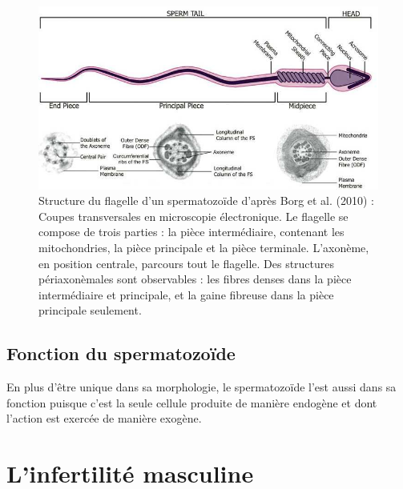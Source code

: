 \documentclass[12pt,twoside]{reedthesis}
\theoremstyle{definition}
\theoremstyle{definition}
\theoremstyle{remark}
\begin{document}
  \begin{figure}
  
  {\centering \includegraphics[scale=.55]{figure/sperm2} 
  
  }
  
  \caption[Structure du flagelle d’un spermatozoïde]{Structure du flagelle d’un spermatozoïde d'après Borg et al. (2010) : Coupes transversales en microscopie électronique. Le flagelle se compose de trois parties : la pièce intermédiaire, contenant les mitochondries, la pièce principale et la pièce terminale. L’axonème, en position centrale, parcours tout le flagelle. Des structures périaxonèmales sont observables : les fibres denses dans la pièce intermédiaire et principale, et la gaine fibreuse dans la pièce principale seulement.}\label{fig:flagelle}
  \end{figure}
  
  \subsection{Fonction du spermatozoïde}\label{fonction-du-spermatozoide}
  
  En plus d'être unique dans sa morphologie, le spermatozoïde l'est aussi
  dans sa fonction puisque c'est la seule cellule produite de manière
  endogène et dont l'action est exercée de manière exogène.
  
  \newpage  
  
  \section{L'infertilité masculine}\label{linfertilite-masculine}
  
\end{document}
